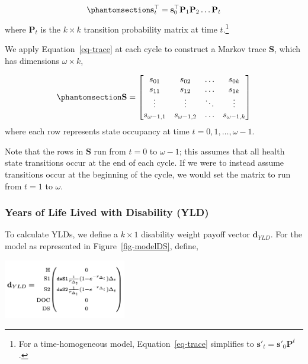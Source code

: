 \documentclass[
]{agujournal2019}
\begin{document}
\begin{equation}\phantomsection\label{eq-trace}{
\mathbf{s}^\top_t=\mathbf{s}^\top_0 \mathbf{P}_1\mathbf{P}_2\dots\mathbf{P}_t
}\end{equation} where \(\mathbf{P}_t\) is the \(k \times k\) transition
probability matrix at time \(t\).\footnote{For a time-homogeneous model,
  Equation~\ref{eq-trace} simplifies to
  \(\mathbf{s}'_t=\mathbf{s}'_0 \mathbf{P}^t\).}

We apply Equation~\ref{eq-trace} at each cycle to construct a Markov
trace \(\mathbf{S}\), which has dimensions \(\omega \times k\),

\begin{equation}\phantomsection\label{eq-markovtrace}{
\mathbf{S} = \begin{bmatrix}
s_{01} & s_{02} & \ldots & s_{0k} \\
s_{11} & s_{12} & \ldots & s_{1k} \\
\vdots & \vdots & \ddots & \vdots \\
s_{\omega-1, 1} & s_{\omega-1, 2} & \ldots & s_{\omega-1, k}
\end{bmatrix}
}\end{equation} where each row represents state occupancy at time
\(t = 0, 1, \ldots, \omega-1\).

Note that the rows in \(\mathbf{S}\) run from \(t=0\) to \(\omega-1\);
this assumes that all health state transitions occur at the end of each
cycle. If we were to instead assume transitions occur at the beginning
of the cycle, we would set the matrix to run from \(t=1\) to \(\omega\).

\subsubsection{Years of Life Lived with Disability
(YLD)}\label{years-of-life-lived-with-disability-yld}

To calculate YLDs, we define a \(k \times 1\) disability weight payoff
vector \(\mathbf{d}_{YLD}\). For the model as represented in
Figure~\ref{fig-modelDS}, define,

\begin{center}
\includegraphics[width=0.4\textwidth,height=\textheight]{images/d_yld.png}
\end{center}
\end{document}
